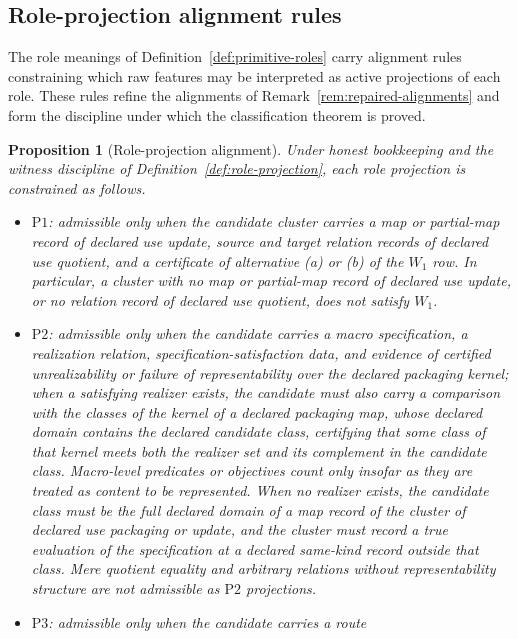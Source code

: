 \documentclass[11pt]{article}
\newtheorem{proposition}[theorem]{Proposition}
\theoremstyle{definition}
\newcommand{\Pone}{\ensuremath{\mathrm{P1}}}
\newcommand{\Ptwo}{\ensuremath{\mathrm{P2}}}
\newcommand{\Pthree}{\ensuremath{\mathrm{P3}}}
\begin{document}
\subsection{Role-projection alignment rules}\label{subsec:alignment-rules}

The role meanings of Definition~\ref{def:primitive-roles} carry
alignment rules constraining which raw features may be interpreted as
active projections of each role. These rules refine the
alignments of Remark~\ref{rem:repaired-alignments} and form the
discipline under which the classification theorem is proved.

\begin{proposition}[Role-projection alignment]\label{prop:alignment-rules}
Under honest bookkeeping and the witness discipline of
Definition~\ref{def:role-projection}, each role projection is
constrained as follows.
\begin{itemize}[topsep=2pt,itemsep=1pt]
  \item \Pone{}: admissible only when the candidate cluster carries a map or partial-map record of declared use update, source and target relation records of declared use quotient, and a certificate of alternative (a) or (b) of the \(W_1\) row. In particular, a cluster with no map or partial-map record
    of declared use update, or no relation record of declared use quotient,
    does not satisfy \(W_1\).
  \item \Ptwo{}: admissible only when the candidate carries a macro
    specification, a realization relation, specification-satisfaction
    data, and evidence of certified unrealizability or failure of
    representability over the declared packaging kernel; when a
    satisfying realizer exists, the candidate must also carry a comparison
    with the classes of the kernel of a declared packaging map, whose
    declared domain contains the declared candidate class, certifying
    that some class of that kernel meets both the realizer set and its
    complement in the candidate class.
    Macro-level predicates or objectives count only insofar as they are
    treated as content to be represented. When no realizer exists, the candidate class must be the full declared domain of a map record of the cluster of declared use packaging or update, and the cluster must record a true evaluation of the specification at a declared same-kind record outside that class. Mere quotient equality and
    arbitrary relations without representability structure are not
    admissible as \Ptwo{} projections.
  \item \Pthree{}: admissible only when the candidate carries a route

\end{itemize}
\end{proposition}
\end{document}
